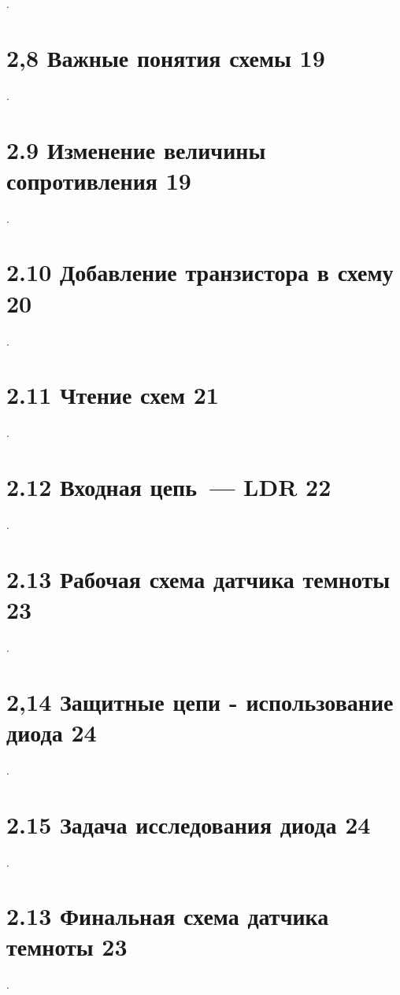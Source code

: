 .

\section{2,8 Важные понятия схемы 19}

.

\section{2.9 Изменение величины сопротивления 19}

.

\section{2.10 Добавление транзистора в схему 20}

.

\section{2.11 Чтение схем 21}

.

\section{2.12 Входная цепь\ --- LDR 22}

.

\section{2.13 Рабочая схема датчика темноты 23}

.

\section{2,14 Защитные цепи - использование диода 24}

.

\section{2.15 Задача исследования диода 24}

.

\section{2.13 Финальная схема датчика темноты 23}

.

